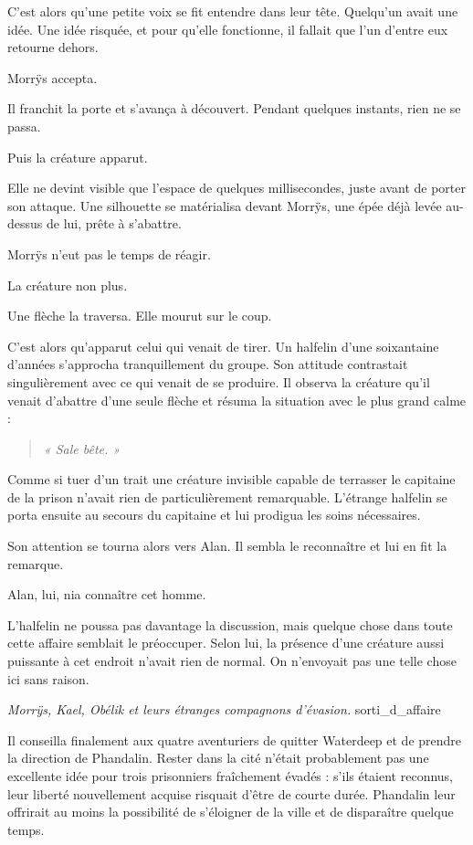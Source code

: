 C'est alors qu'une petite voix se fit entendre dans leur tête. Quelqu'un avait une idée. Une idée risquée, et pour qu'elle fonctionne, il fallait que l'un d'entre eux retourne dehors.

Morrÿs accepta.

Il franchit la porte et s'avança à découvert. Pendant quelques instants, rien ne se passa.

Puis la créature apparut.

Elle ne devint visible que l'espace de quelques millisecondes, juste avant de porter son attaque. Une silhouette se matérialisa devant Morrÿs, une épée déjà levée au-dessus de lui, prête à s'abattre.

Morrÿs n'eut pas le temps de réagir.

La créature non plus.

Une flèche la traversa. Elle mourut sur le coup.

C'est alors qu'apparut celui qui venait de tirer. Un halfelin d'une soixantaine d'années s'approcha tranquillement du groupe. Son attitude contrastait singulièrement avec ce qui venait de se produire. Il observa la créature qu'il venait d'abattre d'une seule flèche et résuma la situation avec le plus grand calme :

\begin{quote}
\itshape
« Sale bête. »
\end{quote}

Comme si tuer d'un trait une créature invisible capable de terrasser le capitaine de la prison n'avait rien de particulièrement remarquable. L'étrange halfelin se porta ensuite au secours du capitaine et lui prodigua les soins nécessaires.

Son attention se tourna alors vers Alan. Il sembla le reconnaître et lui en fit la remarque.

Alan, lui, nia connaître cet homme.

L'halfelin ne poussa pas davantage la discussion, mais quelque chose dans toute cette affaire semblait le préoccuper. Selon lui, la présence d'une créature aussi puissante à cet endroit n'avait rien de normal. On n'envoyait pas une telle chose ici sans raison.

{\textit{Morrÿs, Kael, Obélik et leurs étranges compagnons d'évasion.}}
{sorti_d_affaire}

Il conseilla finalement aux quatre aventuriers de quitter Waterdeep et de prendre la direction de Phandalin. Rester dans la cité n'était probablement pas une excellente idée pour trois prisonniers fraîchement évadés : s'ils étaient reconnus, leur liberté nouvellement acquise risquait d'être de courte durée. Phandalin leur offrirait au moins la possibilité de s'éloigner de la ville et de disparaître quelque temps.

